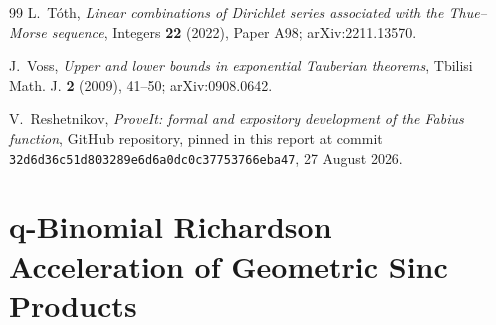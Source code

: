 \documentclass[11pt,oneside]{article}
\numberwithin{equation}{section}
\theoremstyle{definition}
\theoremstyle{remark}
\begin{document}
\begin{thebibliography}{99}
L.~T\'oth,
\emph{Linear combinations of Dirichlet series associated with the Thue--Morse sequence},
Integers \textbf{22} (2022), Paper A98; arXiv:2211.13570.

J.~Voss,
\emph{Upper and lower bounds in exponential Tauberian theorems},
Tbilisi Math. J. \textbf{2} (2009), 41--50; arXiv:0908.0642.

V.~Reshetnikov,
\emph{ProveIt: formal and expository development of the Fabius function},
GitHub repository, pinned in this report at commit
\texttt{32d6d36c51d803289e6d6a0dc0c37753766eba47}, 27 August 2026.

\end{thebibliography}


\newcommand{\D}{\mathrm{D}}

\setcounter{section}{0}
\renewcommand{\thesection}{\arabic{section}}
\part{q-Binomial Richardson Acceleration of Geometric Sinc Products}
\end{document}
